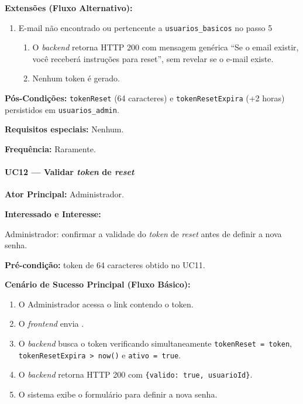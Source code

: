 \textbf{Extensões (Fluxo Alternativo):}

\begin{enumerate}
  \renewcommand{\theenumi}{5a}
  \renewcommand{\labelenumi}{\theenumi.}
  \item E-mail não encontrado ou pertencente a
\texttt{usuarios\_basicos} no passo 5
  \begin{enumerate}
  \item O \textit{backend} retorna HTTP 200 com mensagem
        genérica ``Se o email existir, você receberá
        instruções para reset'', sem revelar se o e-mail
        existe.
  \item Nenhum token é gerado.
  \end{enumerate}
\end{enumerate}

\textbf{Pós-Condições:} \texttt{tokenReset} (64 caracteres)
e \texttt{tokenResetExpira} (+2 horas) persistidos em
\texttt{usuarios\_admin}.

\textbf{Requisitos especiais:} Nenhum.

\textbf{Frequência:} Raramente.

\paragraph{UC12 --- Validar \textit{token} de \textit{reset}}\hfill\break

\textbf{Ator Principal:} Administrador.

\textbf{Interessado e Interesse:}

Administrador: confirmar a validade do \textit{token} de
\textit{reset} antes de definir a nova senha.

\textbf{Pré-condição:} token de 64 caracteres obtido no UC11.

\textbf{Cenário de Sucesso Principal (Fluxo Básico):}
\begin{enumerate}
  \item O Administrador acessa o link contendo o token.
  \item O \textit{frontend} envia
        .
  \item O \textit{backend} busca o token verificando
        simultaneamente \texttt{tokenReset = token},
        \texttt{tokenResetExpira > now()} e
        \texttt{ativo = true}.
  \item O \textit{backend} retorna HTTP 200 com
        \texttt{\{valido: true, usuarioId\}}.
  \item O sistema exibe o formulário para definir a
        nova senha.
\end{enumerate}

